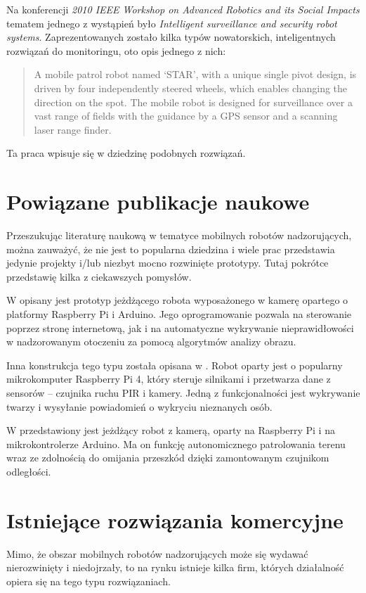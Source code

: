 Na konferencji \textit{2010 IEEE Workshop on Advanced Robotics and its Social Impacts} tematem jednego z wystąpień było \textit{Intelligent surveillance and security robot systems}\cite{5679624}.
Zaprezentowanych zostało kilka typów nowatorskich, inteligentnych rozwiązań do monitoringu, oto opis jednego z nich:

\blockquote{A mobile patrol robot named ‘STAR’, with a unique single pivot design, is driven by four independently steered wheels, which enables changing the direction on the spot.
The mobile robot is designed for surveillance over a vast range of fields with the guidance by a GPS sensor and a scanning laser range finder.}

Ta praca wpisuje się w dziedzinę podobnych rozwiązań.

\section{Powiązane publikacje naukowe}
Przeszukując literaturę naukową w tematyce mobilnych robotów nadzorujących, można zauważyć, że nie jest to popularna dziedzina i wiele prac przedstawia jedynie projekty i/lub niezbyt mocno rozwinięte prototypy.
Tutaj pokrótce przedstawię kilka z ciekawszych pomysłów.

W \cite{shin2016design} opisany jest prototyp jeżdżącego robota wyposażonego w kamerę opartego o platformy Raspberry Pi i Arduino.
Jego oprogramowanie pozwala na sterowanie poprzez stronę internetową, jak i na automatyczne wykrywanie nieprawidłowości w nadzorowanym otoczeniu za pomocą algorytmów analizy obrazu.

Inna konstrukcja tego typu została opisana w \cite{MEDDEB2023104728}.
Robot oparty jest o popularny mikrokomputer Raspberry Pi 4, który steruje silnikami i przetwarza dane z sensorów -- czujnika ruchu PIR i kamery.
Jedną z funkcjonalności jest wykrywanie twarzy i wysyłanie powiadomień o wykryciu nieznanych osób.

W \cite{9375666} przedstawiony jest jeżdżący robot z kamerą, oparty na Raspberry Pi i na mikrokontrolerze Arduino.
Ma on funkcję autonomicznego patrolowania terenu wraz ze zdolnością do omijania przeszkód dzięki zamontowanym czujnikom odległości.

\section{Istniejące rozwiązania komercyjne}
Mimo, że obszar mobilnych robotów nadzorujących może się wydawać nierozwinięty i niedojrzały, to na rynku istnieje kilka firm, których działalność opiera się na tego typu rozwiązaniach.

